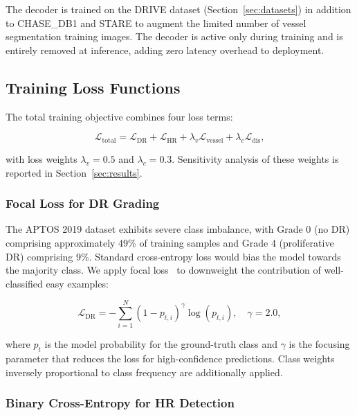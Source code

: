 \documentclass[review,12pt]{elsarticle}
\begin{document}
The decoder is trained on the DRIVE dataset (Section~\ref{sec:datasets}) in
addition to CHASE\_DB1 and STARE to augment the limited number of vessel
segmentation training images. The decoder is active only during training and
is entirely removed at inference, adding zero latency overhead to deployment.

\subsection{Training Loss Functions}

The total training objective combines four loss terms:

\begin{equation}
  \mathcal{L}_{\text{total}} = \mathcal{L}_{\text{DR}} + \mathcal{L}_{\text{HR}}
  + \lambda_v \mathcal{L}_{\text{vessel}} + \lambda_c \mathcal{L}_{\text{dis}},
  \label{eq:total_loss}
\end{equation}

with loss weights $\lambda_v = 0.5$ and $\lambda_c = 0.3$. Sensitivity
analysis of these weights is reported in Section~\ref{sec:results}.

\subsubsection{Focal Loss for DR Grading}

The APTOS 2019 dataset exhibits severe class imbalance, with Grade 0
(no DR) comprising approximately 49\% of training samples and Grade 4
(proliferative DR) comprising 9\%. Standard cross-entropy loss would bias the
model towards the majority class. We apply focal loss~\cite{lin2017focal} to
downweight the contribution of well-classified easy examples:

\begin{equation}
  \mathcal{L}_{\text{DR}} = -\sum_{i=1}^{N} (1 - p_{t,i})^{\gamma} \log(p_{t,i}),
  \quad \gamma = 2.0,
  \label{eq:focal}
\end{equation}

where $p_t$ is the model probability for the ground-truth class and $\gamma$
is the focusing parameter that reduces the loss for high-confidence predictions.
Class weights inversely proportional to class frequency are additionally applied.

\subsubsection{Binary Cross-Entropy for HR Detection}
\end{document}
